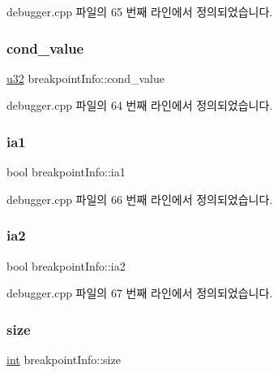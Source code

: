 debugger.\+cpp 파일의 65 번째 라인에서 정의되었습니다.

\mbox{\label{structbreakpoint_info_a06f4bafc5e974ae0adf0e3bf651d2afd}} 
\subsubsection{\texorpdfstring{cond\+\_\+value}{cond\_value}}
{\footnotesize\ttfamily \mbox{\hyperlink{_system_8h_a10e94b422ef0c20dcdec20d31a1f5049}{u32}} breakpoint\+Info\+::cond\+\_\+value}



debugger.\+cpp 파일의 64 번째 라인에서 정의되었습니다.

\mbox{\label{structbreakpoint_info_a6d1174b3ac7266b9454683ee36030b97}} 
\subsubsection{\texorpdfstring{ia1}{ia1}}
{\footnotesize\ttfamily bool breakpoint\+Info\+::ia1}



debugger.\+cpp 파일의 66 번째 라인에서 정의되었습니다.

\mbox{\label{structbreakpoint_info_a5c43894b7302cbb085204b39a14dda91}} 
\subsubsection{\texorpdfstring{ia2}{ia2}}
{\footnotesize\ttfamily bool breakpoint\+Info\+::ia2}



debugger.\+cpp 파일의 67 번째 라인에서 정의되었습니다.

\mbox{\label{structbreakpoint_info_a39a2c2fabe9c630917e8131a99ce61ec}} 
\subsubsection{\texorpdfstring{size}{size}}
{\footnotesize\ttfamily \mbox{\hyperlink{_util_8cpp_a0ef32aa8672df19503a49fab2d0c8071}{int}} breakpoint\+Info\+::size}



